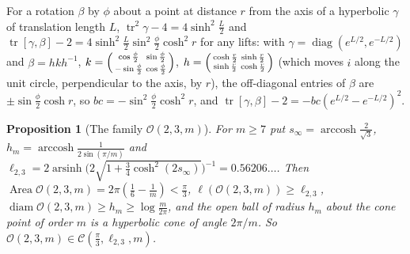 \documentclass[pdflatex,sn-mathphys-num]{sn-jnl}
\theoremstyle{thmstyleone}%
\newtheorem{proposition}[theorem]{Proposition}%
\theoremstyle{thmstylethree}%
\newcommand{\Orb}{\mathcal{O}}
\newcommand{\Cl}{\mathcal{C}}
\newcommand{\Area}{\operatorname{Area}}
\newcommand{\diam}{\operatorname{diam}}
\newcommand{\tr}{\operatorname{tr}}
\begin{document}
For a rotation $\beta$ by $\phi$ about a point at distance $r$ from the axis of a hyperbolic $\gamma$ of translation length $L$, $\tr^2\gamma-4=4\sinh^2\frac L2$ and $\tr[\gamma,\beta]-2=4\sinh^2\frac L2\sin^2\frac\phi2\cosh^2r$ for any lifts: with $\gamma=\operatorname{diag}(e^{L/2},e^{-L/2})$ and $\beta=hkh^{-1}$, $k=\begin{psmallmatrix}\cos\frac\phi2&\sin\frac\phi2\\-\sin\frac\phi2&\cos\frac\phi2\end{psmallmatrix}$, $h=\begin{psmallmatrix}\cosh\frac r2&\sinh\frac r2\\\sinh\frac r2&\cosh\frac r2\end{psmallmatrix}$ (which moves $i$ along the unit circle, perpendicular to the axis, by $r$), the off-diagonal entries of $\beta$ are $\pm\sin\frac\phi2\cosh r$, so $bc=-\sin^2\frac\phi2\cosh^2r$, and $\tr[\gamma,\beta]-2=-bc(e^{L/2}-e^{-L/2})^2$.

\begin{proposition}[The family $\Orb(2,3,m)$]\label{prop:233}
For $m\ge7$ put $s_\infty=\operatorname{arccosh}\frac2{\sqrt3}$, $h_m=\operatorname{arccosh}\frac1{2\sin(\pi/m)}$ and $\ell_{2,3}=2\operatorname{arsinh}\big(2\sqrt{1+\frac34\cosh^2(2s_\infty)}\big)^{-1}=0.56206\ldots$. Then $\Area\Orb(2,3,m)=2\pi(\frac16-\frac1m)<\frac\pi3$, $\ell(\Orb(2,3,m))\ge\ell_{2,3}$, $\diam\Orb(2,3,m)\ge h_m\ge\log\frac m{2\pi}$, and the open ball of radius $h_m$ about the cone point of order $m$ is a hyperbolic cone of angle $2\pi/m$. So $\Orb(2,3,m)\in\Cl(\frac\pi3,\ell_{2,3},m)$.
\end{proposition}
\end{document}
